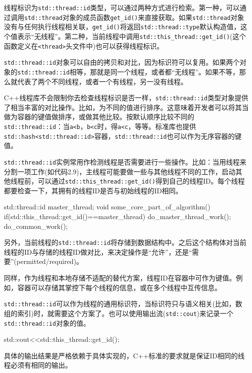 
线程标识为\texttt{std::thread::id}类型，可以通过两种方式进行检索。第一种，可以通过调用\texttt{std::thread}对象的成员函数\texttt{get\_id()}来直接获取。如果\texttt{std::thread}对象没有与任何执行线程相关联，\texttt{get\_id()}将返回\texttt{std::thread::type}默认构造值，这个值表示“无线程”。第二种，当前线程中调用\texttt{std::this\_thread::get\_id()}(这个函数定义在\texttt{<thread>}头文件中)也可以获得线程标识。

\texttt{std::thread::id}对象可以自由的拷贝和对比，因为标识符可以复用。如果两个对象的\texttt{std::thread::id}相等，那就是同一个线程，或者都“无线程”。如果不等，那么就代表了两个不同线程，或者一个有线程，另一没有线程。

C++线程库不会限制你去检查线程标识是否一样，\texttt{std::thread::id}类型对象提供了相当丰富的对比操作。比如，为不同的值进行排序。这意味着开发者可以将其当做为容器的键值做排序，或做其他比较。按默认顺序比较不同的\texttt{std::thread::id}：当\texttt{a<b}，\texttt{b<c}时，得\texttt{a<c}，等等。标准库也提供\texttt{std::hash<std::thread::id>}容器，\texttt{std::thread::id}也可以作为无序容器的键值。

\texttt{std::thread::id}实例常用作检测线程是否需要进行一些操作。比如：当用线程来分割一项工作(如代码2.9)，主线程可能要做一些与其他线程不同的工作，启动其他线程前，可以通过\texttt{std::this\_thread::get\_id()}得到自己的线程ID。每个线程都要检查一下，其拥有的线程ID是否与初始线程的ID相同。

\begin{cpp}
std::thread::id master_thread;
void some_core_part_of_algorithm()
{
  if(std::this_thread::get_id()==master_thread)
  {
    do_master_thread_work();
  }
  do_common_work();
}
\end{cpp}

另外，当前线程的\texttt{std::thread::id}将存储到数据结构中。之后这个结构体对当前线程的ID与存储的线程ID做对比，来决定操作是“允许”，还是“需要”(permitted/required)。

同样，作为线程和本地存储不适配的替代方案，线程ID在容器中可作为键值。例如，容器可以存储其掌控下每个线程的信息，或在多个线程中互传信息。

\texttt{std::thread::id}可以作为线程的通用标识符，当标识符只与语义相关(比如，数组的索引)时，就需要这个方案了。也可以使用输出流(\texttt{std::cout})来记录一个\texttt{std::thread::id}对象的值。

\begin{cpp}
std::cout<<std::this_thread::get_id();
\end{cpp}

具体的输出结果是严格依赖于具体实现的，C++标准的要求就是保证ID相同的线程必须有相同的输出。